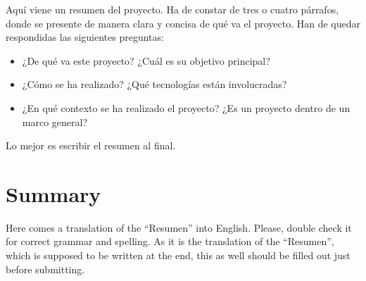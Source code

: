 \documentclass[a4paper, 12pt]{book}
\begin{document}
Aquí viene un resumen del proyecto.
Ha de constar de tres o cuatro párrafos, donde se presente de manera clara y concisa de qué va el proyecto. 
Han de quedar respondidas las siguientes preguntas:

\begin{itemize}
  \item ¿De qué va este proyecto? ¿Cuál es su objetivo principal?
  \item ¿Cómo se ha realizado? ¿Qué tecnologías están involucradas?
  \item ¿En qué contexto se ha realizado el proyecto? ¿Es un proyecto dentro de un marco general?
\end{itemize}

Lo mejor es escribir el resumen al final.


\chapter*{Summary}

Here comes a translation of the ``Resumen'' into English. 
Please, double check it for correct grammar and spelling.
As it is the translation of the ``Resumen'', which is supposed to be written at the end, this as well should be filled out just before submitting.





\tableofcontents 
\cleardoublepage
\listoffigures %
\cleardoublepage
\listoflistings
\end{document}
